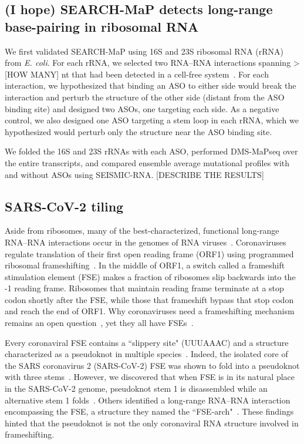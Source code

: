 \documentclass[main.tex]{subfiles}
\begin{document}
\subsection{(I hope) SEARCH-MaP detects long-range base-pairing in ribosomal RNA}

We first validated SEARCH-MaP using 16S and 23S ribosomal RNA (rRNA) from \textit{E. coli}.
For each rRNA, we selected two RNA--RNA interactions spanning > [HOW MANY] nt that had been detected in a cell-free system~\cite{Mustoe2019}.
For each interaction, we hypothesized that binding an ASO to either side would break the interaction and perturb the structure of the other side (distant from the ASO binding site) and designed two ASOs, one targeting each side.
As a negative control, we also designed one ASO targeting a stem loop in each rRNA, which we hypothesized would perturb only the structure near the ASO binding site.

We folded the 16S and 23S rRNAs with each ASO, performed DMS-MaPseq over the entire transcripts, and compared ensemble average mutational profiles with and without ASOs using SEISMIC-RNA.
[DESCRIBE THE RESULTS]

\begin{figure}[H]
	\caption{}
	\label{rrna}
\end{figure}


\subsection{SARS-CoV-2 tiling}

Aside from ribosomes, many of the best-characterized, functional long-range RNA--RNA interactions occur in the genomes of RNA viruses~\cite{Nicholson2014}.
Coronaviruses regulate translation of their first open reading frame (ORF1) using programmed ribosomal frameshifting~\cite{Plant2008}.
In the middle of ORF1, a switch called a frameshift stimulation element (FSE) makes a fraction of ribosomes slip backwards into the -1 reading frame.
Ribosomes that maintain reading frame terminate at a stop codon shortly after the FSE, while those that frameshift bypass that stop codon and reach the end of ORF1.
Why coronaviruses need a frameshifting mechanism remains an open question~\cite{Allan2023}, yet they all have FSEs~\cite{Plant2008}.

Every coronaviral FSE contains a ``slippery site" (UUUAAAC) and a structure characterized as a pseudoknot in multiple species~\cite{Brierley1989,Herald1993,Plant2005b}.
Indeed, the isolated core of the SARS coronavirus 2 (SARS-CoV-2) FSE was shown to fold into a pseudoknot with three stems~\cite{KZhang2021,Jones2022}.
However, we discovered that when FSE is in its natural place in the SARS-CoV-2 genome, pseudoknot stem 1 is disassembled while an alternative stem 1 folds~\cite{Lan2022}.
Others identified a long-range RNA--RNA interaction encompassing the FSE, a structure they named the ``FSE-arch"~\cite{Ziv2020}.
These findings hinted that the pseudoknot is not the only coronaviral RNA structure involved in frameshifting.
\end{document}
